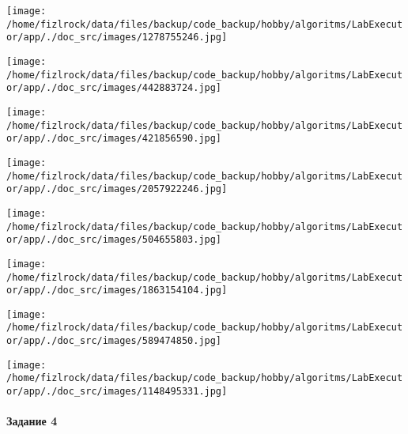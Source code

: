 \documentclass[a4paper, 12pt]{article}
\begin{document}
\texttt{[image: /home/fizlrock/data/files/backup/code\_backup/hobby/algoritms/LabExecutor/app/./doc\_src/images/1278755246.jpg]}

\texttt{[image: /home/fizlrock/data/files/backup/code\_backup/hobby/algoritms/LabExecutor/app/./doc\_src/images/442883724.jpg]}

\texttt{[image: /home/fizlrock/data/files/backup/code\_backup/hobby/algoritms/LabExecutor/app/./doc\_src/images/421856590.jpg]}

\texttt{[image: /home/fizlrock/data/files/backup/code\_backup/hobby/algoritms/LabExecutor/app/./doc\_src/images/2057922246.jpg]}

\texttt{[image: /home/fizlrock/data/files/backup/code\_backup/hobby/algoritms/LabExecutor/app/./doc\_src/images/504655803.jpg]}

\texttt{[image: /home/fizlrock/data/files/backup/code\_backup/hobby/algoritms/LabExecutor/app/./doc\_src/images/1863154104.jpg]}

\texttt{[image: /home/fizlrock/data/files/backup/code\_backup/hobby/algoritms/LabExecutor/app/./doc\_src/images/589474850.jpg]}

\texttt{[image: /home/fizlrock/data/files/backup/code\_backup/hobby/algoritms/LabExecutor/app/./doc\_src/images/1148495331.jpg]}
\pagebreak
\paragraph{Задание 4}
\end{document}
